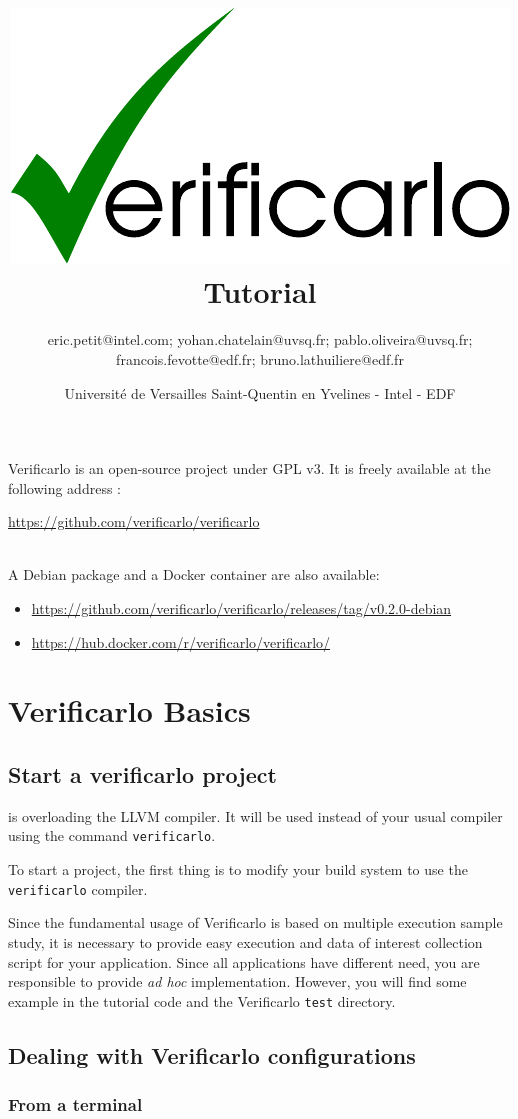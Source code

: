 \documentclass{TP}
\title{\includegraphics[keepaspectratio, scale=0.4]{verificarlo-logo.pdf}\\[4mm]
  Tutorial}
\author{eric.petit@intel.com; yohan.chatelain@uvsq.fr; pablo.oliveira@uvsq.fr;
  francois.fevotte@edf.fr; bruno.lathuiliere@edf.fr}
\date{Université de Versailles Saint-Quentin en Yvelines - Intel - EDF}
\begin{document}
\maketitle
\tableofcontents
\vspace{2cm}
Verificarlo is an open-source project under GPL v3. It is freely available at the following address : \\
\centerline{\url{https://github.com/verificarlo/verificarlo}}

~\\A Debian package and a Docker container are also available: \\
\begin{itemize}
\item \url{https://github.com/verificarlo/verificarlo/releases/tag/v0.2.0-debian}
\item \url{https://hub.docker.com/r/verificarlo/verificarlo/}
\end{itemize}

\section{Verificarlo Basics}
\subsection{Start a verificarlo project}

{} is overloading the LLVM compiler. It will be used instead of your usual compiler using the command {\tt verificarlo}.

To start a project, the first thing is to modify your build system to use the {\tt{verificarlo}} compiler.

Since the fundamental usage of Verificarlo is based on multiple execution sample study, it is necessary to provide easy execution and data of interest collection script for your application. Since all applications have different need, you are responsible to provide {\it ad hoc} implementation. However, you will find some example in the tutorial code and the Verificarlo {\tt test} directory.

\subsection{Dealing with Verificarlo configurations}

\subsubsection{From a terminal}
\end{document}
